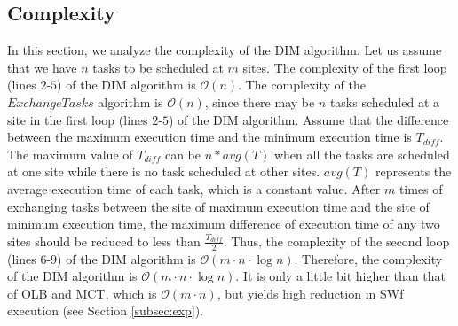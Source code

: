 \subsection{Complexity}

In this section, we analyze the complexity of the DIM algorithm. 
Let us assume that we have $n$ tasks to be scheduled at $m$ sites. 
The complexity of the first loop (lines $2$-$5$) of the DIM algorithm is $\mathcal{O}(n)$.
The complexity of the $ExchangeTasks$ algorithm is $\mathcal{O}(n)$, since there may be $n$ tasks scheduled at a site in the first loop (lines $2$-$5$) of the DIM algorithm. 
Assume that the difference between the maximum execution time and the minimum execution time is $T_{diff}$.
The maximum value of $T_{diff}$ can be $n * avg(T)$ when all the tasks are scheduled at one site while there is no task scheduled at other sites. $avg(T)$ represents the average execution time of each task, which is a constant value.
After $m$ times of exchanging tasks between the site of maximum execution time and the site of minimum execution time, the maximum difference of execution time of any two sites should be reduced to less than $\frac{T_{diff}}{2}$. 
Thus, the complexity of the second loop (lines $6$-$9$) of the DIM algorithm is $\mathcal{O}(m\cdot n\cdot \log{}n)$.
Therefore, the complexity of the DIM algorithm is $\mathcal{O}(m\cdot n\cdot \log{}n)$. 
It is only a little bit higher than that of OLB and MCT, which is $\mathcal{O}(m\cdot n)$, but yields high reduction in SWf execution (see Section \ref{subsec:exp}).

